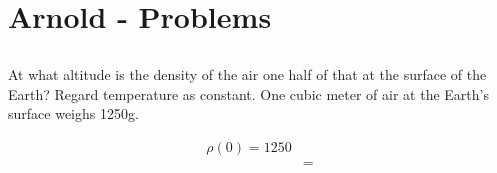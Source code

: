 \begin{align*}

\end{align*}

\section{Arnold - Problems}
\subsection{}
\begin{mdframed}
  At what altitude is the density of the air one half of that at the surface of
  the Earth? Regard temperature as constant. One cubic meter of air at the
  Earth's surface weighs 1250g.
\end{mdframed}
\begin{align*}
  \rho(0) = 1250\\
  &=
\end{align*}